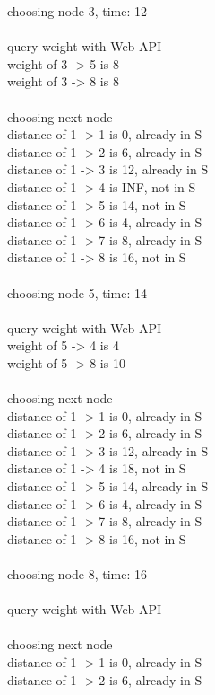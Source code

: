 \documentclass[14pt, a4paper]{article}
\begin{document}
\begin{enumerate}
\begin{enumerate}[label*=\arabic*]
\begin{tcolorbox}[enhanced jigsaw,breakable,pad at break*=1mm,colback=gray!10!white,frame hidden]
choosing node 3, time: 12\\
\\
query weight with Web API\\
weight of 3 -> 5 is 8\\
weight of 3 -> 8 is 8\\
\\
choosing next node\\
distance of 1 -> 1 is 0, already in S\\
distance of 1 -> 2 is 6, already in S\\
distance of 1 -> 3 is 12, already in S\\
distance of 1 -> 4 is INF, not in S\\
distance of 1 -> 5 is 14, not in S\\
distance of 1 -> 6 is 4, already in S\\
distance of 1 -> 7 is 8, already in S\\
distance of 1 -> 8 is 16, not in S\\
\\
choosing node 5, time: 14\\
\\
query weight with Web API\\
weight of 5 -> 4 is 4\\
weight of 5 -> 8 is 10\\
\\
choosing next node\\
distance of 1 -> 1 is 0, already in S\\
distance of 1 -> 2 is 6, already in S\\
distance of 1 -> 3 is 12, already in S\\
distance of 1 -> 4 is 18, not in S\\
distance of 1 -> 5 is 14, already in S\\
distance of 1 -> 6 is 4, already in S\\
distance of 1 -> 7 is 8, already in S\\
distance of 1 -> 8 is 16, not in S\\
\\
choosing node 8, time: 16\\
\\
query weight with Web API\\
\\
choosing next node\\
distance of 1 -> 1 is 0, already in S\\
distance of 1 -> 2 is 6, already in S\\

\end{tcolorbox}
\end{enumerate}
\end{enumerate}
\end{document}
